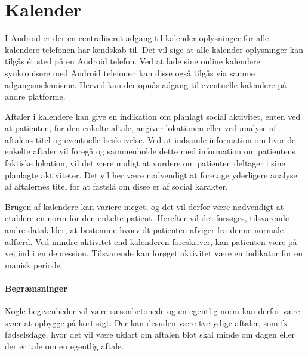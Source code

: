 \section{Kalender}
I Android er der en centraliseret adgang til kalender-oplysninger for alle kalendere telefonen har kendskab til.
Det vil sige at alle kalender-oplysninger kan tilgås \'et sted på en Android telefon.
Ved at lade sine online kalendere synkronisere med Android telefonen kan disse også tilgås via samme adgangsmekanisme.
Herved kan der opnås adgang til eventuelle kalendere på andre platforme.

Aftaler i kalendere kan give en indikation om planlagt social aktivitet, enten ved at patienten, for den enkelte aftale, angiver lokationen eller ved analyse af aftalens titel og eventuelle beskrivelse.
Ved at indsamle information om hvor de enkelte aftaler vil foregå og sammenholde dette med information om patientens faktiske lokation, vil det være muligt at vurdere om patienten deltager i sine planlagte aktiviteter.
Det vil her være nødvendigt at foretage yderligere analyse af aftalernes titel for at fastslå om disse er af social karakter.

Brugen af kalendere kan variere meget, og det vil derfor være nødvendigt at etablere en norm for den enkelte patient.
Herefter vil det forsøges, tilsvarende andre datakilder, at bestemme hvorvidt patienten afviger fra denne normale adfærd.
Ved mindre aktivitet end kalenderen foreskriver, kan patienten være på vej ind i en depression.
Tilsvarende kan forøget aktivitet være en indikator for en manisk periode.

\paragraph{Begrænsninger}
Nogle begivenheder vil være sæsonbetonede og en egentlig norm kan derfor være svær at opbygge på kort sigt.
Der kan desuden være tvetydige aftaler, som fx fødselsdage, hvor det vil være uklart om aftalen blot skal minde om dagen eller der er tale om en egentlig aftale.